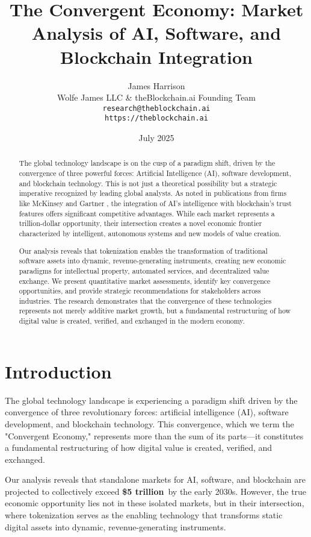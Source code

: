 \documentclass[11pt]{article}
\title{The Convergent Economy: Market Analysis of AI, Software, and Blockchain Integration}
\author{James Harrison\\
        Wolfe James LLC \& theBlockchain.ai Founding Team\\
        \texttt{research@theblockchain.ai}\\
        \texttt{https://theblockchain.ai}}
\date{July 2025}
\newcommand{\marketvalue}[2]{\textcolor{accentgreen}{\textbf{\$#1}}\,\textcolor{darkgray}{#2}}
\begin{document}
\maketitle

\begin{abstract}
The global technology landscape is on the cusp of a paradigm shift, driven by the convergence of three powerful forces: Artificial Intelligence (AI), software development, and blockchain technology. This is not just a theoretical possibility but a strategic imperative recognized by leading global analysts. As noted in publications from firms like McKinsey and Gartner \cite{mckinsey_ai_2023,gartner_ai_2024}, the integration of AI's intelligence with blockchain's trust features offers significant competitive advantages. While each market represents a trillion-dollar opportunity, their intersection creates a novel economic frontier characterized by intelligent, autonomous systems and new models of value creation.

Our analysis reveals that tokenization enables the transformation of traditional software assets into dynamic, revenue-generating instruments, creating new economic paradigms for intellectual property, automated services, and decentralized value exchange. We present quantitative market assessments, identify key convergence opportunities, and provide strategic recommendations for stakeholders across industries. The research demonstrates that the convergence of these technologies represents not merely additive market growth, but a fundamental restructuring of how digital value is created, verified, and exchanged in the modern economy.
\end{abstract}

\section{Introduction}

The global technology landscape is experiencing a paradigm shift driven by the convergence of three revolutionary forces: artificial intelligence (AI), software development, and blockchain technology. This convergence, which we term the "Convergent Economy," represents more than the sum of its parts---it constitutes a fundamental restructuring of how digital value is created, verified, and exchanged.

Our analysis reveals that standalone markets for AI, software, and blockchain are projected to collectively exceed \marketvalue{5 trillion}{} by the early 2030s. However, the true economic opportunity lies not in these isolated markets, but in their intersection, where tokenization serves as the enabling technology that transforms static digital assets into dynamic, revenue-generating instruments.
\end{document}
